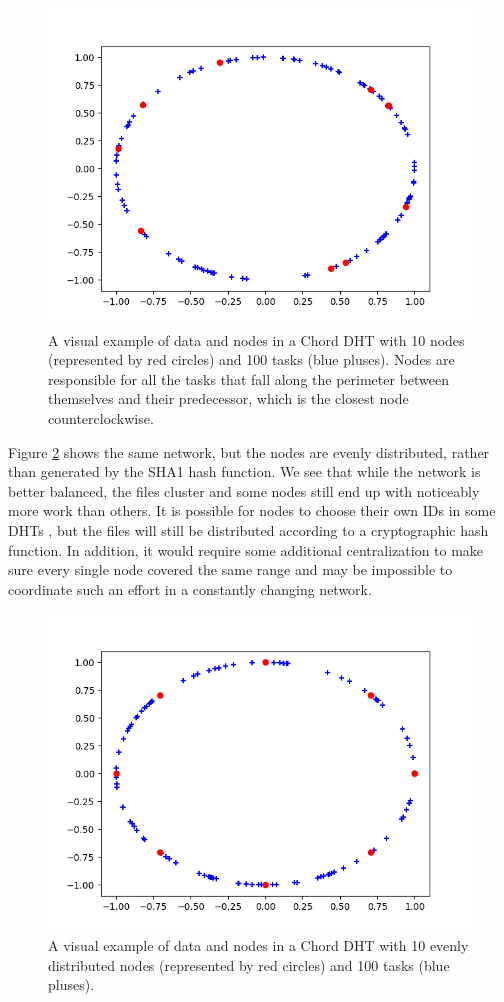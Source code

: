 \documentclass[11pt,conference]{IEEEtran}
\begin{document}
\begin{figure}
	\centering
	\includegraphics[width=0.7\linewidth]{figs/exampleChordUnevenRedone}
	\caption[Distribution of Nodes and Tasks in a Chord DHT]{A visual example of data and nodes in a Chord DHT with 10 nodes (represented by red circles) and 100 tasks (blue pluses). Nodes are responsible for all the tasks that fall along the perimeter between themselves and their predecessor, which is the closest node counterclockwise.}
	\label{fig:exampleChordDistribution}
\end{figure}

Figure \ref{fig:exampleChordEvenDistribution} shows the same network, but the nodes are evenly distributed, rather than generated by the SHA1 hash function.
We see that while the network is better balanced, the files cluster and some nodes still end up with noticeably more work than others.
It is possible for nodes to choose their own IDs in some DHTs \cite{mainline}, but the files will still be distributed according to a cryptographic hash function.
In addition, it would require some additional centralization to make sure every single node covered the same range and may be impossible to coordinate such an effort in a constantly changing network.



\begin{figure}
	\centering
	\includegraphics[width=0.7\linewidth]{figs/exampleChordEvenRedone}
	\caption[Distribution of Tasks in a Chord DHT  with Evenly Distributed Nodes]{A visual example of data and nodes in a Chord DHT with 10 evenly distributed nodes (represented by red circles) and 100 tasks (blue pluses).}
	\label{fig:exampleChordEvenDistribution}
\end{figure}
\end{document}
